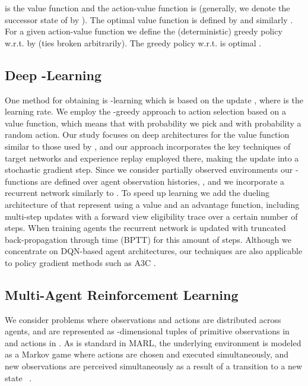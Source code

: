 \documentclass{article}
\begin{document}
 is the value function and the action-value function is  (generally, we denote the successor state of  by ). The optimal value function is defined by  and similarly  . For a given action-value function  we define the (deterministic) greedy policy w.r.t.  by  (ties broken arbitrarily). The greedy policy w.r.t.  is optimal \citep[e.g.][]{SzepesvariAlgorithms}.

\subsection{Deep -Learning}

One method for obtaining  is -learning which is based on the update , where  is the learning rate. We employ the -greedy approach to action selection based on a value function, which means that with  probability we pick  and with probability  a random action. Our study focuses on deep architectures for the value function similar to those used by \citet{dqn15}, and our approach incorporates the key techniques of target networks and experience replay employed there, making the update into a stochastic gradient step. Since we consider partially observed environments our -functions are defined over agent observation histories, ,  and we incorporate a recurrent network similarly to \citet{HausknechtStoneRecurrent}. To speed up learning we add the dueling architecture of \citet{WangDuelling} that represent  using a value and an advantage function, including multi-step updates with a forward view eligibility trace \citep[e.g.][]{HarbPrecupRecurrance} over a certain number of steps. When training agents the recurrent network is updated with truncated back-propagation through time (BPTT) for this amount of steps. Although we concentrate on DQN-based agent architectures, our techniques are also applicable to policy gradient methods such as A3C \citep{MnihAsynchronous}.

\subsection{Multi-Agent Reinforcement Learning}


We consider problems where observations and actions are distributed across  agents, and are represented as -dimensional tuples of primitive observations in  and actions in . As is standard in MARL, the underlying environment is modeled as a Markov game where actions are chosen and executed simultaneously, and new observations are perceived simultaneously as a result of a transition to a new state ~\citep{Littman94,Littman01,HuW03,Busoniu08MARL}.
\end{document}
